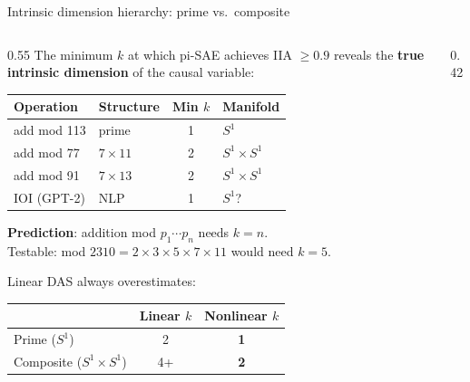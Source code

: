 \documentclass[aspectratio=169,11pt]{beamer}
\begin{document}
\begin{frame}{Intrinsic dimension hierarchy: prime vs.\ composite}

\begin{columns}[T]
\begin{column}{0.55\textwidth}
{\small The minimum $k$ at which pi-SAE achieves IIA $\geq 0.9$ reveals the \textbf{true intrinsic dimension} of the causal variable:}

\vspace{0.5em}
\begin{tabular}{@{}llcl@{}}
\toprule
\textbf{Operation} & \textbf{Structure} & \textbf{Min $k$} & \textbf{Manifold} \\
\midrule
add mod 113 & prime & 1 & $S^1$ \\
add mod 77 & $7 \times 11$ & 2 & $S^1 \times S^1$ \\
add mod 91 & $7 \times 13$ & 2 & $S^1 \times S^1$ \\
IOI (GPT-2) & NLP & 1 & $S^1$? \\
\bottomrule
\end{tabular}

\vspace{0.5em}
{\small\textbf{Prediction}: addition mod $p_1 \cdots p_n$ needs $k = n$.\\
Testable: mod $2310 = 2{\times}3{\times}5{\times}7{\times}11$ would need $k{=}5$.}

\vspace{0.5em}
{\small Linear DAS always overestimates:}\\[0.2em]
{\footnotesize
\begin{tabular}{@{}lcc@{}}
& \textbf{Linear $k$} & \textbf{Nonlinear $k$} \\
\midrule
Prime ($S^1$) & 2 & \textbf{1} \\
Composite ($S^1 {\times} S^1$) & 4+ & \textbf{2} \\
\end{tabular}
}
\end{column}
\begin{column}{0.42\textwidth}
\centering

\end{column}
\end{columns}
\end{frame}
\end{document}
